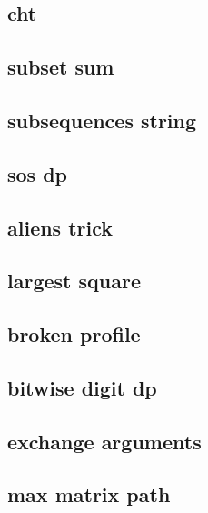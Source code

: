 \subsection{cht}
\raggedbottom
\hrulefill
\subsection{subset sum}
\raggedbottom
\hrulefill
\subsection{subsequences string}
\raggedbottom
\hrulefill
\subsection{sos dp}
\raggedbottom
\hrulefill
\subsection{aliens trick}
\raggedbottom
\hrulefill
\subsection{largest square}
\raggedbottom
\hrulefill
\subsection{broken profile}
\raggedbottom
\hrulefill
\subsection{bitwise digit dp}
\raggedbottom
\hrulefill
\subsection{exchange arguments}
\raggedbottom
\hrulefill
\subsection{max matrix path}
\raggedbottom
\hrulefill
